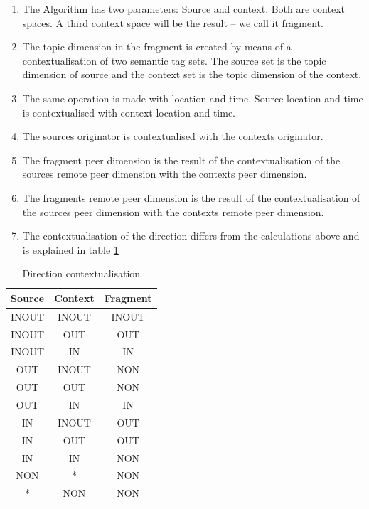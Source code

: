 \begin{enumerate}
    \item The Algorithm has two parameters: Source and context. Both are context spaces. A third context space will be the result -- we call it fragment.
    \item The topic dimension in the fragment is created by means of a contextualisation of two semantic tag sets. The source set is the topic dimension of source and the context set is the topic dimension of the context. 
    \item The same operation is made with location and time. Source location and time is contextualised with context location and time.
    \item The sources originator is contextualised with the contexts originator.
    \item The fragment peer dimension is the result of the contextualisation of the sources remote peer dimension with the contexts peer dimension.
    \item The fragments remote peer dimension is the result of the contextualisation of the sources peer dimension with the contexts remote peer dimension.
    \item The contextualisation of the direction differs from the calculations above and is explained in table \ref{tab:directionCalculation}
\end{enumerate}

\begin{table}[t]
\centering
\begin{tabular}{|c|c|c|}
\hline
Source & Context & Fragment \\
\hline
INOUT & INOUT & INOUT \\
\hline
INOUT & OUT & OUT \\
\hline
INOUT & IN & IN \\
\hline
OUT & INOUT & NON \\
\hline
OUT & OUT & NON \\
\hline
OUT & IN & IN \\
\hline
IN & INOUT & OUT \\
\hline
IN & OUT & OUT \\
\hline
IN & IN & NON \\
\hline
NON & * & NON \\
\hline
* & NON & NON \\
\hline
\end{tabular}
\caption{Direction contextualisation}
\label{tab:directionCalculation}
\end{table}

